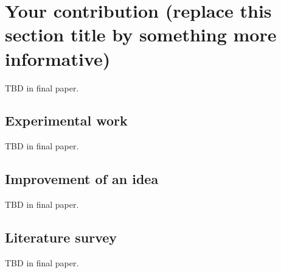 \section{Your contribution (replace this section title by something more informative)}
TBD in final paper.
\subsection*{Experimental work}
TBD in final paper.
\subsection*{Improvement of an idea}
TBD in final paper.
\subsection*{Literature survey}
TBD in final paper.